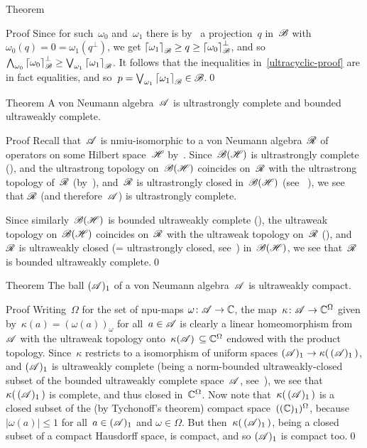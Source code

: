 \documentclass[a]{subfiles}
\begin{document}
\begin{parsec}
\begin{point}{Theorem}
\begin{point}{Proof}
Since for such~$\omega_0$ and~$\omega_1$
there is 
by~
a projection~$q$ in~$\mathscr{B}$
with $\omega_0(q)=0=\omega_1(q^\perp)$,
we get 
$\left\lceil\omega_1\right\rceil_{\mathscr{B}} \geq q \geq 
\left\lceil\omega_0\right\rceil_{\mathscr{B}}^\perp$,
and so~$\bigwedge_{\omega_0} \left\lceil\omega_0\right\rceil_{\mathscr{B}}^\perp 
\geq \bigvee_{\omega_1} \left\lceil\omega_1\right\rceil_{\mathscr{B}}$.
It follows that the inequalities in~\eqref{ultracyclic-proof}
are in fact equalities,
and so~$p=\bigvee_{\omega_1}\left\lceil\omega_1\right\rceil_{\mathscr{B}} \in \mathscr{B}$.\qed
\end{point}
\end{point}
\begin{point}[vn-complete]{Theorem}%
A von Neumann algebra~$\mathscr{A}$ is ultrastrongly complete
and bounded ultraweakly complete.
\begin{point}{Proof}%
Recall that~$\mathscr{A}$
is nmiu-isomorphic
to a von Neumann algebra~$\mathscr{R}$ of operators on some Hilbert space~$\mathscr{H}$
by~.
Since~$\mathscr{B}(\mathscr{H})$ is ultrastrongly complete
(),
and the ultrastrong topology on~$\mathscr{B}(\mathscr{H})$
coincides on~$\mathscr{R}$ with the ultrastrong topology of~$\mathscr{R}$
(by~),
and~$\mathscr{R}$ is 
 ultrastrongly closed in~$\mathscr{B}(\mathscr{H})$
(see~ ),
we see that $\mathscr{R}$ (and therefore~$\mathscr{A}$) is 
ultrastrongly complete.

Since similarly~$\mathscr{B}(\mathscr{H})$
is bounded ultraweakly complete (),
the ultraweak topology on~$\mathscr{B}(\mathscr{H})$
coincides on~$\mathscr{R}$ with the ultraweak topology on~$\mathscr{R}$
(),
and~$\mathscr{R}$ is ultraweakly closed 
(= ultrastrongly closed, see~)
in~$\mathscr{B}(\mathscr{H})$,
we see that~$\mathscr{R}$ is bounded ultraweakly complete.\qed
\end{point}
\end{point}
\begin{point}{Theorem}%
The ball $(\mathscr{A})_1$
of a von Neumann algebra~$\mathscr{A}$ is ultraweakly compact.
\begin{point}{Proof}%
Writing~$\Omega$ for
the set of npu-maps $\omega\colon \mathscr{A}\to\mathbb{C}$,
the map~$\kappa\colon \mathscr{A}\to \mathbb{C}^\Omega$
given by~$\kappa(a)=(\omega(a))_\omega$ for all~$a\in\mathscr{A}$
is clearly a linear homeomorphism from~$\mathscr{A}$ with the  ultraweak topology 
onto~$\kappa(\mathscr{A})\,\subseteq \mathbb{C}^\Omega$ endowed
with the product topology.
Since~$\kappa$ restricts
to a isomorphism of uniform spaces
$(\mathscr{A})_1\to \kappa(\,(\mathscr{A})_1\,)$,
and $(\mathscr{A})_1$ is ultraweakly complete 
(being a norm-bounded ultraweakly-closed
subset of the bounded ultraweakly complete space~$\mathscr{A}$,
see~),
we see that $\kappa(\,(\mathscr{A})_1\,)$
is complete,
and thus closed in~$\mathbb{C}^\Omega$.
Now note that~$\kappa(\,(\mathscr{A})_1\,)$ is a closed subset 
of the (by Tychonoff's theorem) compact
space~$((\mathbb{C})_1)^\Omega$, 
because $\left|\omega(a)\right|\leq 1$ for all~$a\in(\mathscr{A})_1$
and $\omega\in\Omega$.
But then~$\kappa(\,(\mathscr{A})_1\,)$,
being a closed subset of a compact Hausdorff space,
is compact,
and so $(\mathscr{A})_1$ is compact too.\qed
\end{point}
\end{point}
\end{parsec}
\end{document}
